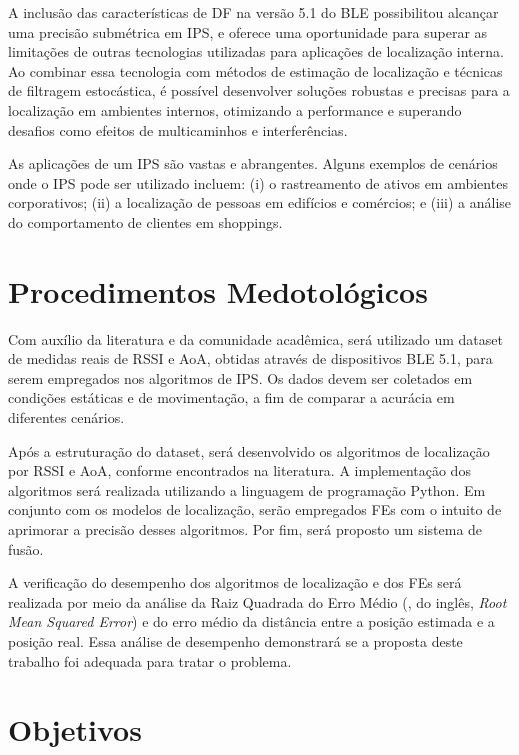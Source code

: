 A inclusão das características de DF na versão 5.1 do BLE possibilitou alcançar uma precisão submétrica em IPS, e oferece uma oportunidade para superar as limitações de outras tecnologias utilizadas para aplicações de localização interna. Ao combinar essa tecnologia com métodos de estimação de localização e técnicas de filtragem estocástica, é possível desenvolver soluções robustas e precisas para a localização em ambientes internos, otimizando a performance e superando desafios como efeitos de multicaminhos e interferências.

As aplicações de um IPS são vastas e abrangentes. Alguns exemplos de cenários onde o IPS pode ser utilizado incluem: (i) o rastreamento de ativos em ambientes corporativos; (ii) a localização de pessoas em edifícios e comércios; e (iii) a análise do comportamento de clientes em shoppings. 

\section{Procedimentos Medotológicos}
\label{sec:metodologia}

Com auxílio da literatura e da comunidade acadêmica, será utilizado um dataset de medidas reais de RSSI e AoA, obtidas através de dispositivos BLE 5.1, para serem empregados nos algoritmos de IPS. Os dados devem ser coletados em condições estáticas e de movimentação, a fim de comparar a acurácia em diferentes cenários.

Após a estruturação do dataset, será desenvolvido os algoritmos de localização por RSSI e AoA, conforme encontrados na literatura. A implementação dos algoritmos será realizada utilizando a linguagem de programação Python. Em conjunto com os modelos de localização, serão empregados FEs com o intuito de aprimorar a precisão desses algoritmos. Por fim, será proposto um sistema de fusão.

A verificação do desempenho dos algoritmos de localização e dos FEs será realizada por meio da análise da Raiz Quadrada do Erro Médio (, do inglês, \textit{Root Mean Squared Error}) e do erro médio da distância entre a posição estimada e a posição real. Essa análise de desempenho demonstrará se a proposta deste trabalho foi adequada para tratar o problema.

\section{Objetivos}
\label{sec:objetivos}

